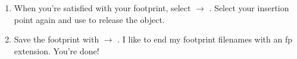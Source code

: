 \begin{enumerate}
	\item When you're satisfied with your footprint, select  $\rightarrow$ .  Select your insertion point again and use  to release the object.
	\item Save the footprint with  $\rightarrow$ .  I like to end my footprint filenames with an fp extension.  You're done!
\end{enumerate}

